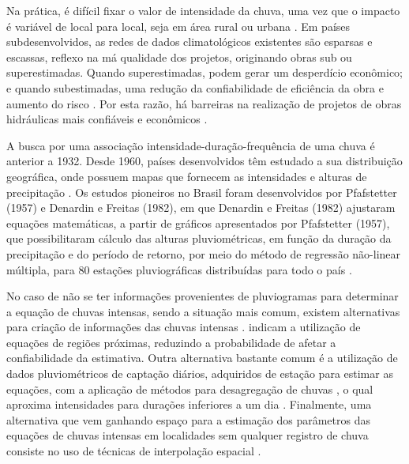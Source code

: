 Na prática, é difícil fixar o valor de intensidade da chuva, uma vez que o impacto é variável de local para local, seja em área rural ou urbana \cite{hidro-basica}. Em países subdesenvolvidos, as redes de dados climatológicos existentes são esparsas e escassas, reflexo na má qualidade dos projetos, originando obras sub ou superestimadas. Quando superestimadas, podem gerar um desperdício econômico; e quando subestimadas, uma redução da confiabilidade de eficiência da obra e aumento do risco \cite{tucci1993}. Por esta razão, há barreiras na realização de projetos de obras hidráulicas mais confiáveis e econômicos \cite{chuva-bahia}. 

A busca por uma associação intensidade-duração-frequência de uma chuva é anterior a 1932. Desde 1960, países desenvolvidos têm estudado a sua distribuição geográfica, onde possuem mapas que fornecem as intensidades e alturas de precipitação \cite{desagregacao}. Os estudos pioneiros no Brasil foram desenvolvidos por Pfafstetter (1957) e Denardin e Freitas (1982), em que Denardin e Freitas (1982) ajustaram equações matemáticas, a partir de gráficos apresentados por Pfafstetter (1957), que possibilitaram cálculo das alturas pluviométricas, em função da duração da precipitação e do período de retorno, por meio do método de regressão não-linear múltipla, para 80 estações pluviográficas distribuídas para todo o país \cite{relacao-idf-nordeste}.

No caso de não se ter informações provenientes de pluviogramas para determinar a equação de chuvas intensas, sendo a situação mais comum, existem alternativas para criação de informações das chuvas intensas \cite{interpolacao-chuva}.  indicam a utilização de equações de regiões próximas, reduzindo a probabilidade de afetar a confiabilidade da estimativa. Outra alternativa bastante comum é a utilização de dados pluviométricos de captação diários, adquiridos de estação para estimar as equações, com a aplicação de métodos para desagregação de chuvas \cite{idf-rs}, o qual aproxima intensidades para durações inferiores a um dia \cite{relacoes-sc}. Finalmente, uma alternativa que vem ganhando espaço para a estimação dos parâmetros das equações de chuvas intensas em localidades sem qualquer registro de chuva consiste no uso de técnicas de interpolação espacial \cite{chuva-bahia}.

